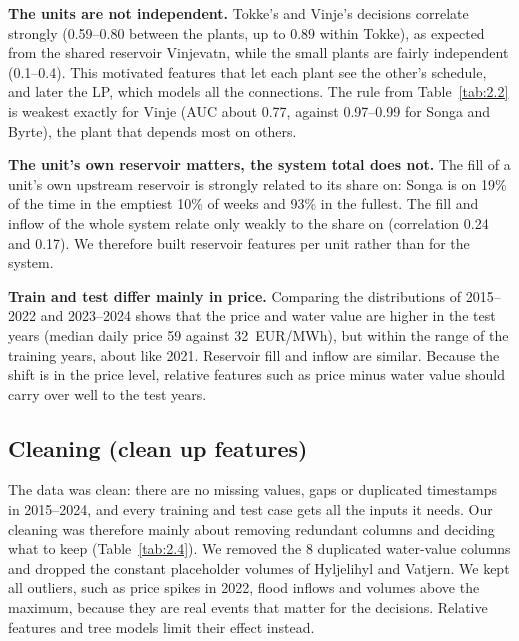\begin{table}[H]
  \centering\small
  \caption{The upstream-only rule vs the net (upstream $-$ downstream) rule as simple on/off classifiers}
  \label{tab:2.3}
\end{table}

\textbf{The units are not independent.} Tokke's and Vinje's decisions correlate strongly (0.59--0.80 between the plants, up to 0.89 within Tokke), as expected from the shared reservoir Vinjevatn, while the small plants are fairly independent (0.1--0.4). This motivated features that let each plant see the other's schedule, and later the LP, which models all the connections. The rule from Table~\ref{tab:2.2} is weakest exactly for Vinje (AUC about 0.77, against 0.97--0.99 for Songa and Byrte), the plant that depends most on others.

\textbf{The unit's own reservoir matters, the system total does not.} The fill of a unit's own upstream reservoir is strongly related to its share on: Songa is on 19\% of the time in the emptiest 10\% of weeks and 93\% in the fullest. The fill and inflow of the whole system relate only weakly to the share on (correlation 0.24 and 0.17). We therefore built reservoir features per unit rather than for the system.

\textbf{Train and test differ mainly in price.} Comparing the distributions of 2015--2022 and 2023--2024 shows that the price and water value are higher in the test years (median daily price 59 against 32~EUR/MWh), but within the range of the training years, about like 2021. Reservoir fill and inflow are similar. Because the shift is in the price level, relative features such as price minus water value should carry over well to the test years.

\subsection{Cleaning (clean up features)}\label{sec:2.6}

The data was clean: there are no missing values, gaps or duplicated timestamps in 2015--2024, and every training and test case gets all the inputs it needs. Our cleaning was therefore mainly about removing redundant columns and deciding what to keep (Table~\ref{tab:2.4}). We removed the 8 duplicated water-value columns and dropped the constant placeholder volumes of Hyljelihyl and Vatjern. We kept all outliers, such as price spikes in 2022, flood inflows and volumes above the maximum, because they are real events that matter for the decisions. Relative features and tree models limit their effect instead.

